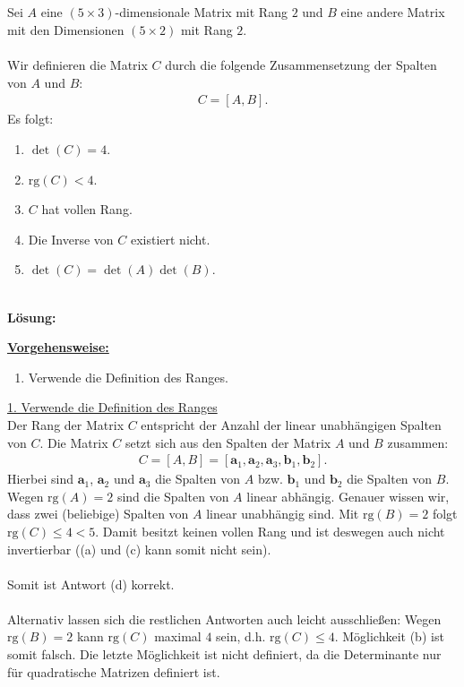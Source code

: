 \subsection*{}
Sei $ A $ eine $ (5 \times 3) $-dimensionale Matrix mit Rang $ 2 $ und $ B $ eine andere Matrix mit den Dimensionen $ (5 \times 2) $ mit Rang $ 2 $.\\
\\
Wir definieren die Matrix $ C $ durch die folgende Zusammensetzung der Spalten von $ A $ und $ B $:
\begin{align*}
	C = [A, B].
\end{align*}
Es folgt:
\renewcommand{\labelenumi}{(\alph{enumi})}
\begin{enumerate}
	\item 
	$ \det(C) = 4$.
	\item
	$ \mathrm{rg}(C) < 4 $.
	\item
	$ C$ hat vollen Rang.
	\item
	Die Inverse von $C$ existiert nicht.
	\item
	$\det(C) = \det(A) \det(B)$.
\end{enumerate}
\ \\
\textbf{Lösung:}
\begin{mdframed}
	\underline{\textbf{Vorgehensweise:}}
	\renewcommand{\labelenumi}{\theenumi.}
	\begin{enumerate}
		\item Verwende die Definition des Ranges.
	\end{enumerate}
\end{mdframed}

\underline{1. Verwende die Definition des Ranges}\\
Der Rang der Matrix $C$ entspricht der Anzahl der linear unabhängigen Spalten von $C$.
Die Matrix $C$ setzt sich aus den Spalten der Matrix $A$ und $B$ zusammen:
\begin{align*}
	C = [A, B] = [ \mathbf{a}_1, \mathbf{a}_2, \mathbf{a}_3,  \mathbf{b}_1, \mathbf{b}_2 ].
\end{align*}
Hierbei sind $\mathbf{a}_1$, $\mathbf{a}_2$ und $\mathbf{a}_3$ die Spalten von $A$ bzw. $\mathbf{b}_1$ und $\mathbf{b}_2$ die Spalten von $ B$.\\
Wegen $\mathrm{rg}(A) = 2$ sind die Spalten von $A$ linear abhängig. Genauer wissen wir, dass zwei (beliebige) Spalten von $A$ linear unabhängig sind. 
Mit $\mathrm{rg}(B) = 2$ folgt $\mathrm{rg}(C) \leq 4 < 5$.
Damit besitzt keinen vollen Rang und ist deswegen auch nicht invertierbar ((a) und (c) kann somit nicht sein).\\
\\
Somit ist Antwort (d) korrekt.\\
\\
Alternativ lassen sich die restlichen Antworten auch leicht ausschließen:
Wegen $\mathrm{rg}(B) = 2$ kann $\mathrm{rg}(C) $ maximal $4$ sein, d.h. $\mathrm{rg}(C) \leq 4$. Möglichkeit (b) ist somit falsch.
Die letzte Möglichkeit ist nicht definiert, da die Determinante nur für quadratische Matrizen definiert ist.



